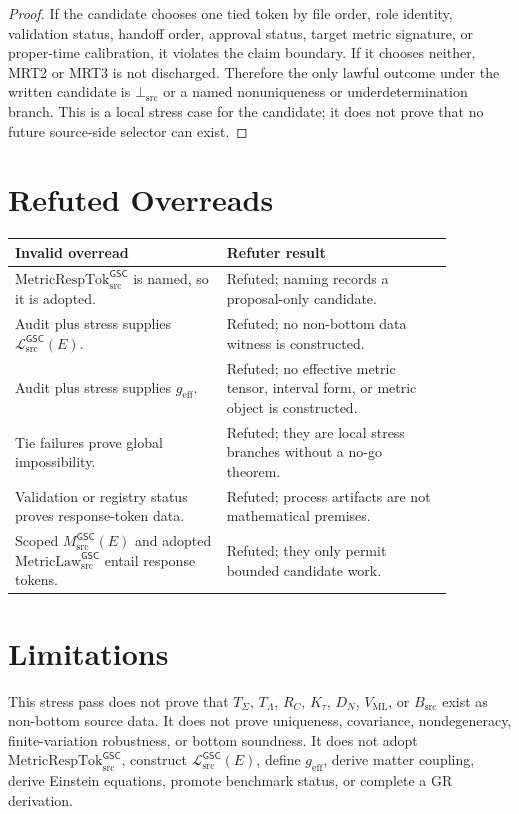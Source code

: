 \documentclass[11pt]{article}
\newcommand{\MsrcGSC}{M_{\mathrm{src}}^{\mathsf{GSC}}}
\newcommand{\MetricLaw}{\mathrm{MetricLaw}_{\mathrm{src}}^{\mathsf{GSC}}}
\newcommand{\MetricRespTok}{\mathrm{MetricRespTok}_{\mathrm{src}}^{\mathsf{GSC}}}
\newcommand{\MetricData}{\mathcal{L}_{\mathrm{src}}^{\mathsf{GSC}}}
\newcommand{\BottomSrc}{\bot_{\mathrm{src}}}
\newcommand{\geff}{g_{\mathrm{eff}}}
\begin{document}
\begin{proof}
If the candidate chooses one tied token by file order, role identity,
validation status, handoff order, approval status, target metric signature, or
proper-time calibration, it violates the claim boundary. If it chooses neither,
MRT2 or MRT3 is not discharged. Therefore the only lawful outcome under the
written candidate is \(\BottomSrc\) or a named nonuniqueness or
underdetermination branch. This is a local stress case for the candidate; it
does not prove that no future source-side selector can exist.
\end{proof}

\section{Refuted Overreads}

\begin{center}
\begin{tabular}{p{0.42\linewidth}p{0.45\linewidth}}
\toprule
Invalid overread & Refuter result \\
\midrule
\(\MetricRespTok\) is named, so it is adopted. & Refuted; naming records a
proposal-only candidate. \\
Audit plus stress supplies \(\MetricData(E)\). & Refuted; no non-bottom data
witness is constructed. \\
Audit plus stress supplies \(\geff\). & Refuted; no effective metric tensor,
interval form, or metric object is constructed. \\
Tie failures prove global impossibility. & Refuted; they are local stress
branches without a no-go theorem. \\
Validation or registry status proves response-token data. & Refuted; process
artifacts are not mathematical premises. \\
Scoped \(\MsrcGSC(E)\) and adopted \(\MetricLaw\) entail response tokens. &
Refuted; they only permit bounded candidate work. \\
\bottomrule
\end{tabular}
\end{center}

\section{Limitations}

This stress pass does not prove that \(T_{\Sigma}\), \(T_{\Lambda}\), \(R_C\),
\(K_{\tau}\), \(D_N\), \(V_{\mathrm{ML}}\), or \(B_{\mathrm{src}}\) exist as
non-bottom source data. It does not prove uniqueness, covariance,
nondegeneracy, finite-variation robustness, or bottom soundness. It does not
adopt \(\MetricRespTok\), construct \(\MetricData(E)\), define \(\geff\),
derive matter coupling, derive Einstein equations, promote benchmark status,
or complete a GR derivation.
\end{document}
